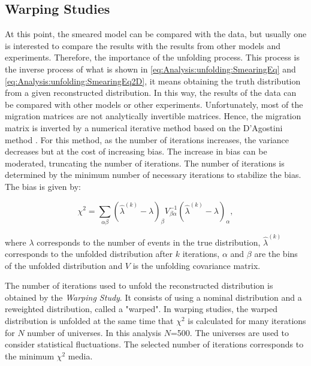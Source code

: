 \pagebreak
\subsection{Warping Studies}
\label{Cap:Analysis:Unfolding:WarpingStudies}

At this point, the smeared model can be compared with the data, but usually one is interested to compare the results with the results from other models and experiments. Therefore, the importance of the unfolding process. This process is the inverse process of what is shown in \ref{eq:Analysis:unfolding:SmearingEq} and \ref{eq:Analysis:unfolding:SmearingEq2D}, it means obtaining the truth distribution from a given reconstructed distribution. In this way, the results of the data can be compared with other models or other experiments. Unfortunately, most of the migration matrices are not analytically invertible matrices. Hence, the migration matrix is inverted by a numerical iterative method based on the D'Agostini method \cite{DAGOSTINI1995487}\cite{dagostini2010improved}. For this method, as the number of iterations increases, the variance decreases but at the cost of increasing bias. The increase in bias can be moderated, truncating the number of iterations. The number of iterations is determined by the minimum number of necessary iterations to stabilize the bias. The bias is given by:

\begin{equation}
    \chi^2 = \sum_{\alpha\beta}(\hat{\lambda}^{(k)}-\lambda)_\beta V^{-1}_{\beta\alpha} (\hat{\lambda}^{(k)}-\lambda)_\alpha,
    \label{eq:Analysis:Unfolding:chi2WarpingStudies}
\end{equation}

where $\lambda$ corresponds to the number of events in the true distribution, $\hat{\lambda}^{(k)}$ corresponds to the unfolded distribution after $k$ iterations, $\alpha$ and $\beta$ are the bins of the unfolded distribution and $V$ is the unfolding covariance matrix.  

The number of iterations used to unfold the reconstructed distribution is obtained by the \textit{Warping Study}. It consists of using a nominal distribution and a reweighted distribution, called a "warped". In warping studies, the warped distribution is unfolded at the same time that $\chi^2$ is calculated for many iterations for $N$ number of universes. In this analysis $N$=500. The universes are used to consider statistical fluctuations. The selected number of iterations corresponds to the minimum $\chi^2$ media.

